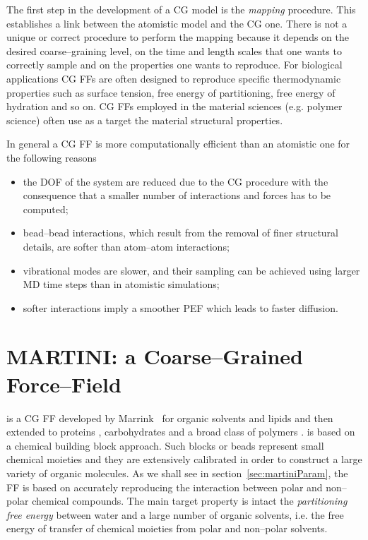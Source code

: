 The first step in the development of a \ac{CG} model is the \textit{mapping} procedure. This establishes a link
between the atomistic model and the \ac{CG} one. There is not a unique or correct procedure to perform the
mapping because it depends on the desired coarse--graining level, on the time and length scales that one wants to
correctly sample and on the properties one wants to reproduce. For biological applications \ac{CG} \acp{FF} are
often designed to reproduce specific thermodynamic properties such as surface tension, free energy of
partitioning, free energy of hydration and so on. \ac{CG} \acp{FF} employed in the material sciences (e.g.
polymer science) often use as a target the material structural properties.

In general a \ac{CG} \ac{FF} is more computationally efficient than an atomistic one for the following reasons
\begin{itemize}
\item the \ac{DOF} of the system are reduced due to the \ac{CG} procedure with the consequence that a smaller number of interactions and forces has to be computed;
\item bead--bead interactions, which result from the removal of finer structural details, are softer than atom--atom interactions;
\item vibrational modes are slower, and their sampling can be achieved using larger \ac{MD} time steps than in atomistic simulations;
\item softer interactions imply a smoother \ac{PEF} which leads to faster diffusion.
\end{itemize}

\section{MARTINI: a Coarse--Grained Force--Field}
\label{sec:martini}
\martini is a \ac{CG} \ac{FF} developed by Marrink \etal\, \cite{Martini} for organic solvents and lipids and
then extended to proteins \cite{MartiniProtein}, carbohydrates \cite{MartiniCarbo} and a broad class of polymers
\cite{MartiniPolymers}. \martini is based on a chemical building block approach. Such \martini blocks or beads
represent small chemical moieties and they are extensively calibrated in order to construct a large variety of
organic molecules. As we shall see in section~\ref{sec:martiniParam}, the \ac{FF} is based on accurately
reproducing the interaction between polar and non--polar chemical compounds. The main target property is intact
the \textit{partitioning free energy} between water and a large number of organic solvents, i.e. the free energy
of transfer of chemical moieties from polar and non--polar solvents.

